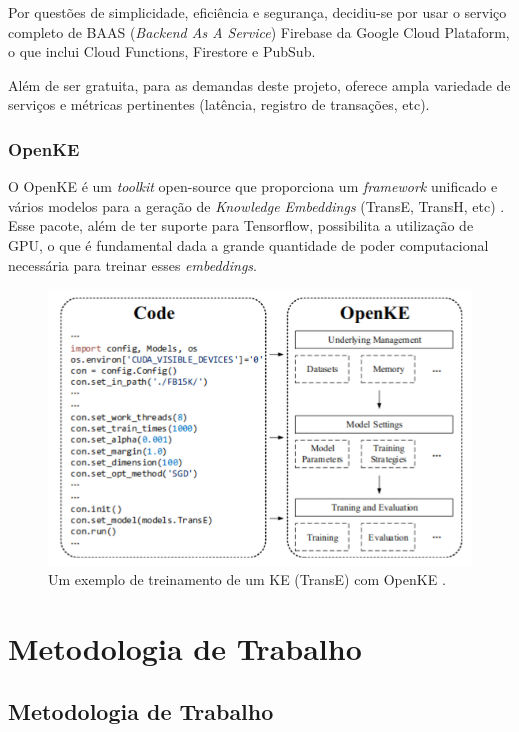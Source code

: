 \documentclass[]{politex}
\begin{document}
Por questões de simplicidade, eficiência e segurança, decidiu-se por usar o serviço completo de BAAS (\textit{Backend As A Service}) Firebase da Google Cloud Plataform, o que inclui Cloud Functions, Firestore e PubSub.

Além de ser gratuita, para as demandas deste projeto, oferece ampla variedade de serviços e métricas pertinentes (latência, registro de transações, etc).

\section{OpenKE}

O OpenKE é um \textit{toolkit} open-source que proporciona um \textit{framework} unificado e vários modelos para a geração de \textit{Knowledge Embeddings} (TransE, TransH, etc) \cite{D18-2024}. Esse pacote, além de ter suporte para Tensorflow, possibilita a utilização de GPU, o que é fundamental dada a grande quantidade de poder computacional necessária para treinar esses \textit{embeddings}. 

\begin{figure}[h]
    \centering
    \includegraphics[scale=0.5]{images/openKE.png}
    \caption{Um exemplo de treinamento de um KE (TransE) com OpenKE \cite{D18-2024}.}
    \label{fig:trasnE_transH}
\end{figure}

\part{Metodologia de Trabalho}

\chapter{Metodologia de Trabalho}
\end{document}
